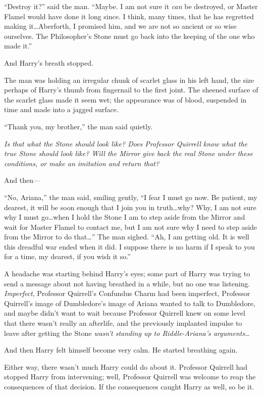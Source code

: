 “Destroy it?” said the man. “Maybe. I am not sure it \emph{can} be destroyed, or Master Flamel would have done it long since. I think, many times, that he has regretted making it…Aberforth, I promised him, and we are not so ancient or so wise ourselves. The Philosopher’s Stone must go back into the keeping of the one who made it.”

And Harry’s breath stopped.

The man was holding an irregular chunk of scarlet glass in his left hand, the size perhaps of Harry’s thumb from fingernail to the first joint. The sheened surface of the scarlet glass made it seem wet; the appearance was of blood, suspended in time and made into a jagged surface.

“Thank you, my brother,” the man said quietly.

\emph{Is that what the Stone should look like? Does Professor Quirrell know what the true Stone should look like? Will the Mirror give back the real Stone under these conditions, or make an imitation and return that?}

And then—

“No, Ariana,” the man said, smiling gently, “I fear I must go now. Be patient, my dearest, it will be soon enough that I join you in truth…why? Why, I am not sure why I must go…when I hold the Stone I am to step aside from the Mirror and wait for Master Flamel to contact me, but I am not sure why I need to step aside from the Mirror to do that…” The man sighed. “Ah, I am getting old. It is well this dreadful war ended when it did. I suppose there is no harm if I speak to you for a time, my dearest, if you wish it so.”

A headache was starting behind Harry’s eyes; some part of Harry was trying to send a message about not having breathed in a while, but no one was listening. \emph{Imperfect}, Professor Quirrell’s Confundus Charm had been imperfect, Professor Quirrell’s image of Dumbledore’s image of Ariana wanted to talk to Dumbledore, and maybe didn’t want to wait because Professor Quirrell knew on some level that there wasn’t really an afterlife, and the previously implanted impulse to leave after getting the Stone \emph{wasn’t standing up to Riddle-Ariana’s arguments…}

And then Harry felt himself become very calm. He started breathing again.

Either way, there wasn’t much Harry could do about it. Professor Quirrell had stopped Harry from intervening; well, Professor Quirrell was welcome to reap the consequences of that decision. If the consequences caught Harry as well, so be it.

